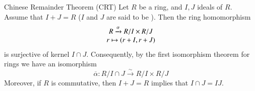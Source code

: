 \documentclass[12pt, a4paper, twoside, openright, titlepage]{book}
\begin{document}
\begin{namthm}{Chinese Remainder Theorem (CRT)}{}
    Let $R$ be a ring, and $I,J$ ideals of $R$. Assume that $I + J = R$ ($I$ and $J$ are said to be ). Then the ring homomorphism \begin{equation}
        \begin{array}{c} R\xrightarrow{\alpha} R/I \times R/J \\ r \mapsto (r+I, r+J) \end{array}
    \end{equation}
    is surjective of kernel $I \cap J$. Consequently, by the first isomorphism theorem for rings we have an isomorphism \begin{equation}
        \overline{\alpha}: R/I\cap J \xrightarrow{\sim} R/I \times R/J
    \end{equation}
    Moreover, if $R$ is commutative, then $I+J = R$ implies that $I \cap J = IJ$.
\end{namthm}
\end{document}
